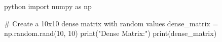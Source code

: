 python
import numpy as np

# Create a 10x10 dense matrix with random values
dense_matrix = np.random.rand(10, 10)
print("Dense Matrix:")
print(dense_matrix)